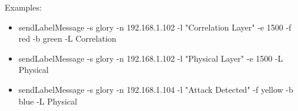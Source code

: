 Examples:
\begin{itemize}

\item sendLabelMessage -s glory -n 192.168.1.102 -l "Correlation Layer" -e 1500 -f red -b green -L Correlation
\item sendLabelMessage -s glory -n 192.168.1.102 -l "Physical Layer" -e 1500 -L Physical
\item sendLabelMessage -s glory -n 192.168.1.104 -l "Attack Detected" -f yellow -b blue -L Physical 

\end{itemize}


